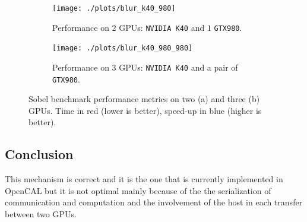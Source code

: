 \begin{figure}
	\begin{subfigure}{1.0\textwidth}
		\caption{Performance on $2$ GPUs: \texttt{NVIDIA K40} and $1$ \texttt{GTX980}.}
		\label{fig:blur_k40_980}
		\texttt{[image: ./plots/blur\_k40\_980]}
		
	\end{subfigure}		
	\endminipage \hfill
	\vspace{5mm}
	\begin{subfigure}{1.0\textwidth}
		\texttt{[image: ./plots/blur\_k40\_980\_980]}
		\caption{Performance on $3$ GPUs: \texttt{NVIDIA K40} and a pair of \texttt{GTX980}.}
		\label{fig:blur_k40_980_980}
	\end{subfigure}
	\endminipage\hfill
	\caption[Sobel benchmark performance metrics.]{Sobel benchmark performance metrics on two (a) and three (b) GPUs. Time in red (lower is better), speed-up in blue (higher is better).}
	\label{fig:blur_performance}
\end{figure}


\subsection{Conclusion}
This mechanism is correct and it is the one that is currently implemented in OpenCAL but it is not optimal mainly because of the the serialization of communication and computation and the involvement of the host in each transfer between two GPUs.


